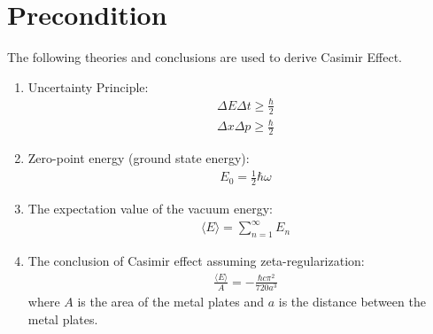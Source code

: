 \section{Precondition}
The following theories and conclusions are used to derive Casimir Effect.
\begin{enumerate}
    \item Uncertainty Principle\citep*{heisenberg1930physical}:
        \begin{align}
            &\Delta E \Delta t \ge \frac{\hbar}{2}\\
            &\Delta x \Delta p \ge \frac{\hbar}{2}
        \end{align}
    \item Zero-point energy (ground state energy): \begin{align}&E_0 = \frac{1}{2}\hbar\omega\end{align}
    \item The expectation value of the vacuum energy: \begin{align}&\langle E \rangle = \sum_{n=1}^{\infty} E_n\end{align}
    \item The conclusion of Casimir effect\citep*{Casimir:1948dh} assuming zeta-regularization\citep*{enwiki:1212199656}: 
    \begin{align}&\frac{\langle E \rangle}{A} = -\frac{\hbar c \pi^2}{720 a^3}\end{align}
    where \(A\) is the area of the metal plates and $a$ is the distance between the metal plates.
\end{enumerate}
